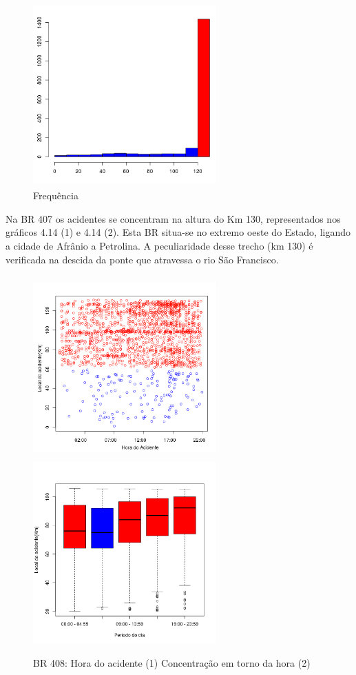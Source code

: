 \quad
\begin{figure}[h]
	\centering
	\caption{ Frequência}
	\includegraphics[width=7cm,height=7cm]{Figuras/Preprocess/br407_2.png}
\end{figure}

Na BR 407 os acidentes se concentram na altura do Km 130, representados nos gráficos 4.14 (1) e 4.14 (2).
Esta BR situa-se no extremo oeste do Estado, ligando a cidade de Afrânio a Petrolina. A peculiaridade desse trecho (km 130) é verificada na descida da ponte que atravessa o rio São Francisco.

\pagebreak

\begin{figure}[h]
	\caption{BR 408: Hora do acidente (1) Concentração em torno da hora (2)}
	\includegraphics[width=7cm,height=7cm]{Figuras/Preprocess/br408_1.png}
	\includegraphics[width=7cm,height=7cm]{Figuras/Preprocess/br408_2.png}

\end{figure}

